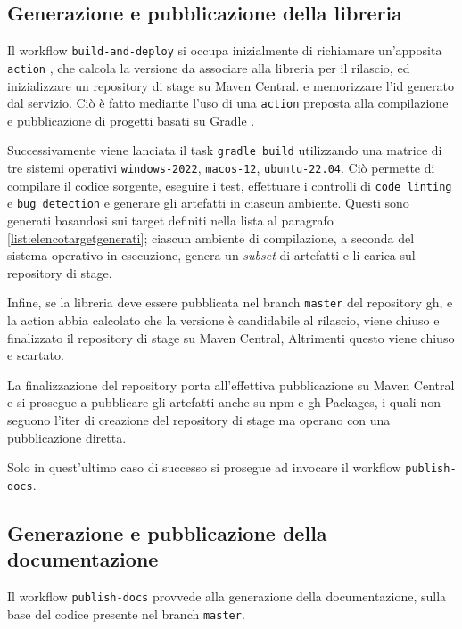\documentclass[12pt,a4paper,openright,twoside]{book}
\begin{document}
\subsection{Generazione e pubblicazione della libreria}
Il workflow \texttt{build-and-deploy} si occupa inizialmente di
richiamare un'apposita \texttt{action} \cite{WebsitePrecomputeSemanticReleaseVersionAction}, che calcola la versione da associare
alla libreria per il rilascio, ed inizializzare un repository di stage su Maven Central.
e memorizzare l'id generato dal servizio. Ciò è fatto mediante l'uso di una \texttt{action} preposta alla compilazione e
pubblicazione di progetti basati su Gradle \cite{WebsiteBuildCheckDeployGradleAction}.

Successivamente viene lanciata il task \texttt{gradle build} utilizzando una matrice di tre sistemi operativi
 \texttt{windows-2022}, \texttt{macos-12}, \texttt{ubuntu-22.04}. Ciò permette di compilare il codice sorgente, 
 eseguire i test, effettuare i controlli di \texttt{code linting} e \texttt{bug detection} e generare gli artefatti
 in ciascun ambiente. Questi sono generati basandosi sui target definiti nella lista al paragrafo \ref{list:elencotargetgenerati};
ciascun ambiente di compilazione, a seconda del sistema operativo in esecuzione, genera un \textit{subset} di artefatti e li carica sul repository di stage.

Infine, se la libreria deve essere pubblicata nel branch \texttt{master} del repository \ac{gh}, e la action \cite{WebsitePrecomputeSemanticReleaseVersionAction}
abbia calcolato che la versione è candidabile al rilascio, viene chiuso e finalizzato il repository di stage su Maven Central,
Altrimenti questo viene chiuso e scartato. 

La finalizzazione del repository porta all'effettiva pubblicazione su Maven Central e si prosegue a pubblicare gli artefatti
anche su \ac{npm} e \ac{gh} Packages, i quali non seguono l'iter di creazione del repository di stage ma operano con una pubblicazione diretta.

Solo in quest'ultimo caso di successo si prosegue ad invocare il workflow \texttt{publish-docs}.





\subsection{Generazione e pubblicazione della documentazione}
Il workflow \texttt{publish-docs} provvede alla generazione della documentazione, sulla base del codice presente
nel branch \texttt{master}. 
\end{document}

